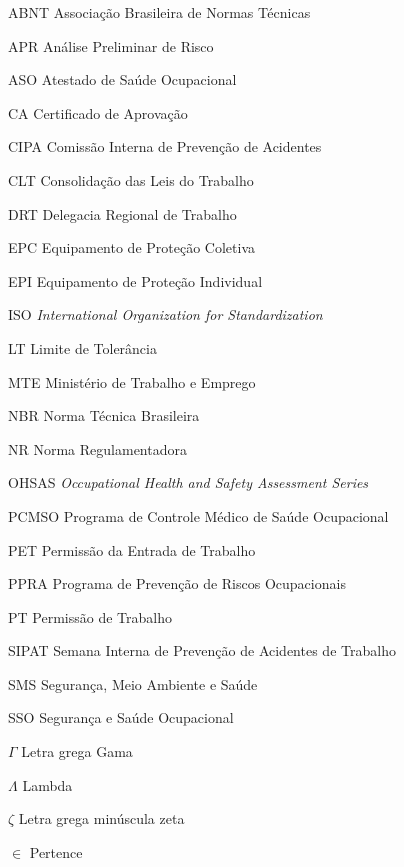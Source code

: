 \begin{siglas}
  \item[ABNT] Associação Brasileira de Normas Técnicas
  \item[APR] Análise Preliminar de Risco
  \item[ASO] Atestado de Saúde Ocupacional
  \item[CA] Certificado de Aprovação
  \item[CIPA] Comissão Interna de Prevenção de Acidentes
  \item[CLT] Consolidação das Leis do Trabalho
  \item[DRT] Delegacia Regional de Trabalho
  \item[EPC] Equipamento de Proteção Coletiva
  \item[EPI] Equipamento de Proteção Individual
  \item[ISO] \emph{International Organization for Standardization}
  \item[LT] Limite de Tolerância
  \item[MTE] Ministério de Trabalho e Emprego
  \item[NBR] Norma Técnica Brasileira
  \item[NR] Norma Regulamentadora
  \item[OHSAS] \emph{Occupational Health and Safety Assessment Series}
  \item[PCMSO] Programa de Controle Médico de Saúde Ocupacional
  \item[PET] Permissão da Entrada de Trabalho
  \item[PPRA] Programa de Prevenção de Riscos Ocupacionais
  \item[PT] Permissão de Trabalho
  \item[SIPAT] Semana Interna de Prevenção de Acidentes de Trabalho
  \item[SMS] Segurança, Meio Ambiente e Saúde
  \item[SSO] Segurança e Saúde Ocupacional
\end{siglas}

\begin{simbolos}
  \item[$ \Gamma $] Letra grega Gama
  \item[$ \Lambda $] Lambda
  \item[$ \zeta $] Letra grega minúscula zeta
  \item[$ \in $] Pertence
\end{simbolos}
